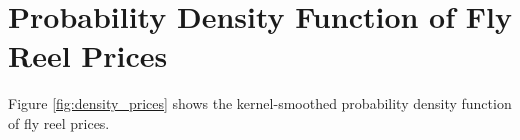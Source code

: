 %
%
%
%
%
%
%
%
%






\section{Probability Density Function of Fly Reel Prices}

Figure \ref{fig:density_prices} shows  the kernel-smoothed probability density function of fly reel prices.

